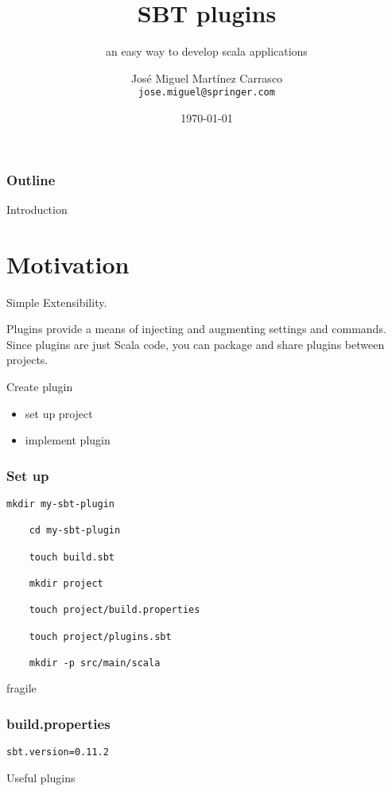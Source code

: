 \documentclass{beamer}
\title{SBT plugins}
\subtitle{an easy way to develop scala applications}
\author{José Miguel Martínez Carrasco \\ \texttt{jose.miguel@springer.com}}
\institute[Springer]{Springer}
\date{\today}
\begin{document}
\begin{frame}[plain] 
  \titlepage
\end{frame}

\begin{frame}
  \frametitle{Outline}
  \tableofcontents
\end{frame}

\begin{frame}{Introduction}

  \section{Motivation}

  Simple Extensibility.
  	
  Plugins provide a means of injecting and augmenting settings and commands. Since plugins are just Scala code, you can package and share plugins between projects.

\end{frame}

\begin{frame}{Create plugin}

  \begin{itemize}

    \item set up project

    \item implement plugin

  \end{itemize}
\end{frame}

\begin{frame}[fragile]
  \frametitle{Set up}

  \lstset{language=ksh,basicstyle=\ttfamily}
  \begin{lstlisting}[frame=none]
    mkdir my-sbt-plugin

    cd my-sbt-plugin

    touch build.sbt

    mkdir project

    touch project/build.properties

    touch project/plugins.sbt

    mkdir -p src/main/scala
  \end{lstlisting}
\end{frame}


\begin{frame}{fragile}
  \frametitle{build.properties}

    \lstset{language=ksh,basicstyle=\ttfamily}
    \begin{lstlisting}[frame=none]
      sbt.version=0.11.2
    \end{lstlisting}
\end{frame}


\begin{frame}{Useful plugins}

\end{frame}

\begin{frame}
\end{frame}
\end{document}

